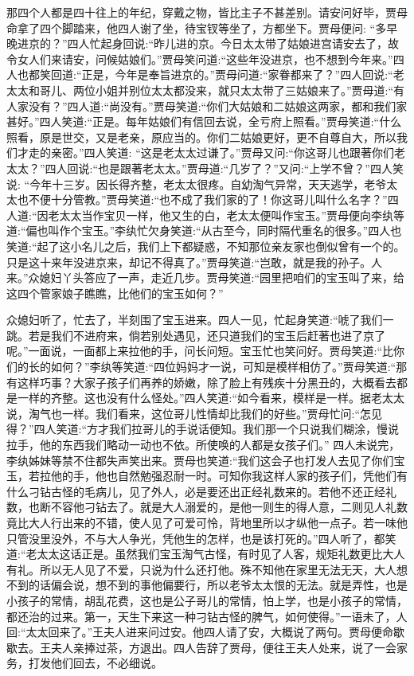 \begin{parag}
    那四个人都是四十往上的年纪，穿戴之物，皆比主子不甚差别。请安问好毕，贾母命拿了四个脚踏来，他四人谢了坐，待宝钗等坐了，方都坐下。贾母便问: “多早晚进京的？”四人忙起身回说:“昨儿进的京。今日太太带了姑娘进宫请安去了，故令女人们来请安，问候姑娘们。”贾母笑问道:“这些年没进京，也不想到今年来。”四人也都笑回道:“正是，今年是奉旨进京的。”贾母问道:“家眷都来了？”四人回说:“老太太和哥儿、两位小姐并别位太太都没来，就只太太带了三姑娘来了。”贾母道:“有人家没有？”四人道:“尚没有。”贾母笑道:“你们大姑娘和二姑娘这两家，都和我们家甚好。”四人笑道:“正是。每年姑娘们有信回去说，全亏府上照看。”贾母笑道:“什么照看，原是世交，又是老亲，原应当的。你们二姑娘更好，更不自尊自大，所以我们才走的亲密。”四人笑道: “这是老太太过谦了。”贾母又问:“你这哥儿也跟著你们老太太？”四人回说:“也是跟著老太太。”贾母道:“几岁了？”又问:“上学不曾？”四人笑说: “今年十三岁。因长得齐整，老太太很疼。自幼淘气异常，天天逃学，老爷太太也不便十分管教。”贾母笑道:“也不成了我们家的了！你这哥儿叫什么名字？”四人道:“因老太太当作宝贝一样，他又生的白，老太太便叫作宝玉。”贾母便向李纨等道:“偏也叫作个宝玉。”李纨忙欠身笑道:“从古至今，同时隔代重名的很多。”四人也笑道:“起了这小名儿之后，我们上下都疑惑，不知那位亲友家也倒似曾有一个的。只是这十来年没进京来，却记不得真了。”贾母笑道:“岂敢，就是我的孙子。人来。”众媳妇丫头答应了一声，走近几步。贾母笑道:“园里把咱们的宝玉叫了来，给这四个管家娘子瞧瞧，比他们的宝玉如何？”
\end{parag}


\begin{parag}
    众媳妇听了，忙去了，半刻围了宝玉进来。四人一见，忙起身笑道:“唬了我们一跳。若是我们不进府来，倘若别处遇见，还只道我们的宝玉后赶著也进了京了呢。”一面说，一面都上来拉他的手，问长问短。宝玉忙也笑问好。贾母笑道:“比你们的长的如何？”李纨等笑道:“四位妈妈才一说，可知是模样相仿了。”贾母笑道:“那有这样巧事？大家子孩子们再养的娇嫩，除了脸上有残疾十分黑丑的，大概看去都是一样的齐整。这也没有什么怪处。”四人笑道:“如今看来，模样是一样。据老太太说，淘气也一样。我们看来，这位哥儿性情却比我们的好些。”贾母忙问:“怎见得？”四人笑道:“方才我们拉哥儿的手说话便知。我们那一个只说我们糊涂，慢说拉手，他的东西我们略动一动也不依。所使唤的人都是女孩子们。” 四人未说完，李纨姊妹等禁不住都失声笑出来。贾母也笑道:“我们这会子也打发人去见了你们宝玉，若拉他的手，他也自然勉强忍耐一时。可知你我这样人家的孩子们，凭他们有什么刁钻古怪的毛病儿，见了外人，必是要还出正经礼数来的。若他不还正经礼数，也断不容他刁钻去了。就是大人溺爱的，是他一则生的得人意，二则见人礼数竟比大人行出来的不错，使人见了可爱可怜，背地里所以才纵他一点子。若一味他只管没里没外，不与大人争光，凭他生的怎样，也是该打死的。”四人听了，都笑道:“老太太这话正是。虽然我们宝玉淘气古怪，有时见了人客，规矩礼数更比大人有礼。所以无人见了不爱，只说为什么还打他。殊不知他在家里无法无天，大人想不到的话偏会说，想不到的事他偏要行，所以老爷太太恨的无法。就是弄性，也是小孩子的常情，胡乱花费，这也是公子哥儿的常情，怕上学，也是小孩子的常情，都还治的过来。第一，天生下来这一种刁钻古怪的脾气，如何使得。”一语未了，人回:“太太回来了。”王夫人进来问过安。他四人请了安，大概说了两句。贾母便命歇歇去。王夫人亲捧过茶，方退出。四人告辞了贾母，便往王夫人处来，说了一会家务，打发他们回去，不必细说。
\end{parag}


